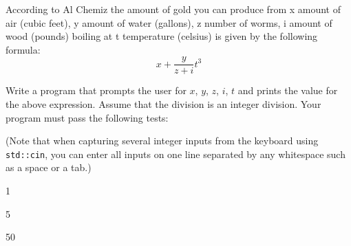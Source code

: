 According to Al Chemiz the amount of gold you can produce from 
x amount of air (cubic feet), 
y amount of water (gallons), 
z number of worms, 
i amount of wood (pounds) boiling at t temperature (celsius) is given by the following formula:
\[
x + \frac{y}{z+i} t^3
\]

Write a program that prompts the user for $x$, $y$, $z$, $i$, $t$ 
and prints the value for the above expression. 
Assume that the division is an integer division. 
Your program must pass the following tests:

(Note that when capturing several integer inputs from the keyboard using 
\verb!std::cin!, you can enter all inputs on one line separated by any 
whitespace such as a space or a tab.)

\resett
\nextt
\begin{console}[commandchars=\\\{\}]
1
\end{console}

\nextt
\begin{console}[commandchars=\\\{\}]
5
\end{console}

\nextt
\begin{console}[commandchars=\\\{\}]
50
\end{console}
